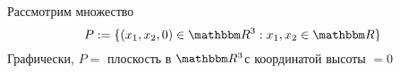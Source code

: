     



\begin{frame}
    
    \vspace{2em}
    \Eg 
    Рассмотрим множество 
    \begin{equation*}
        P := \setntn{(x_1, x_2, 0) \in \RR^3}{ x_1, x_2 \in \RR}
    \end{equation*}
    Графически, $P =$ плоскость в $\RR^3$с координатой высоты $=0$
    \begin{figure}
       \begin{center}
       \end{center}
    \end{figure}

\end{frame}



